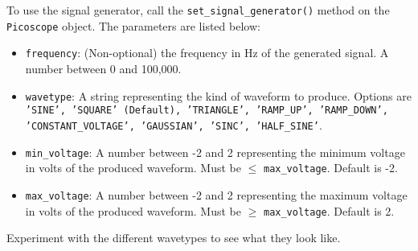 \documentclass{article}
\begin{document}
To use the signal generator, call the \texttt{set\_signal\_generator()} method on the \texttt{Picoscope} object. The parameters are listed below:

\begin{itemize}



    \item \texttt{frequency}: (Non-optional) the frequency in Hz of the generated signal. A number between 0 and 100,000.
    
    \item \texttt{wavetype}: A string representing the kind of waveform to produce. Options are \texttt{'SINE', 'SQUARE' (Default), 'TRIANGLE', 'RAMP\_UP', 'RAMP\_DOWN', 'CONSTANT\_VOLTAGE', 'GAUSSIAN', 'SINC', 'HALF\_SINE'}.
    
    \item \texttt{min\_voltage}: A number between -2 and 2 representing the minimum voltage in volts of the produced waveform. Must be $\leq$ \texttt{max\_voltage}. Default is -2.
    
    \item \texttt{max\_voltage}: A number between -2 and 2 representing the maximum voltage in volts of the produced waveform. Must be $\geq$ \texttt{max\_voltage}. Default is 2.
    

\end{itemize}
Experiment with the different wavetypes to see what they look like.
\end{document}
